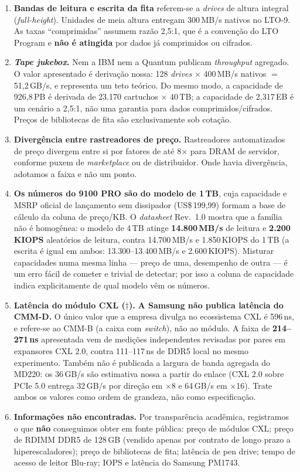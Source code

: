 \documentclass[11pt,a4paper]{article}
\begin{document}
\begin{enumerate}[label=\textbf{N\arabic*.},leftmargin=*]
\item \textbf{Bandas de leitura e escrita da fita} referem-se a \emph{drives} de altura
      integral (\emph{full-height}). Unidades de meia altura entregam 300\,MB/s nativos no
      LTO-9. As taxas ``comprimidas'' assumem razão 2,5:1, que é a convenção do LTO Program
      e \textbf{não é atingida} por dados já comprimidos ou cifrados.
\item \textbf{\emph{Tape jukebox}.} Nem a IBM nem a Quantum publicam \emph{throughput}
      agregado. O valor apresentado é derivação nossa: 128 \emph{drives} $\times$ 400\,MB/s
      nativos $=$ 51,2\,GB/s, e representa um teto teórico. Do mesmo modo, a capacidade de
      926,8\,PB é derivada de 23.170 cartuchos $\times$ 40\,TB; a capacidade de
      2,317\,EB é um cenário a 2,5:1, não uma garantia para dados comprimidos/cifrados. Preços de bibliotecas de fita
      são exclusivamente sob cotação.
\item \textbf{Divergência entre rastreadores de preço.} Rastreadores automatizados de preço
      divergem entre si por fatores de até 8$\times$ para DRAM de servidor, conforme puxem
      de \emph{marketplace} ou de distribuidor. Onde havia divergência, adotamos a faixa e
      não um ponto.
\item \textbf{Os números do 9100 PRO são do modelo de 1\,TB}, cuja capacidade e MSRP oficial
      de lançamento sem dissipador (US\$\,199,99) formam a base de cálculo da coluna de preço/KB. O
      \emph{datasheet} Rev.~1.0 mostra
      que a família não é homogênea: o modelo de 4\,TB atinge \textbf{14.800\,MB/s} de
      leitura e \textbf{2.200\,KIOPS} aleatórios de leitura, contra 14.700\,MB/s e
      1.850\,KIOPS do 1\,TB (a escrita é igual em ambos: 13.300--13.400\,MB/s e
      2.600\,KIOPS). Misturar capacidades numa mesma linha --- preço de uma, desempenho de
      outra --- é um erro fácil de cometer e trivial de detectar; por isso a coluna de
      capacidade indica explicitamente de qual modelo vêm os números.
\item \textbf{Latência do módulo CXL ($\dagger$).} \textbf{A Samsung não publica latência
      do CMM-D.} O único valor que a empresa divulga no ecossistema CXL é 596\,ns, e refere-se
      ao CMM-B (a caixa com \emph{switch}), não ao módulo. A faixa de \textbf{214--271\,ns}
      apresentada vem de medições independentes revisadas por pares em expansores CXL 2.0,
      contra 111--117\,ns de DDR5 local no mesmo experimento. Também não é publicada a
      largura de banda agregada do MD220: os 36\,GB/s são estimativa nossa a partir do enlace
      (CXL 2.0 sobre PCIe 5.0 entrega 32\,GB/s por direção em $\times$8 e 64\,GB/s em
      $\times$16). Trate ambos os valores como ordem de grandeza, não como especificação.
\item \textbf{Informações não encontradas.} Por transparência acadêmica, registramos o que
      \textbf{não} conseguimos obter em fonte pública: preço de módulos CXL; preço de RDIMM
      DDR5 de 128\,GB (vendido apenas por contrato de longo prazo a hiperescaladores);
      preço de bibliotecas de fita; latência de pen drive; tempo de acesso de leitor
      Blu-ray; IOPS e latência do Samsung PM1743.
\end{enumerate}
\end{document}
